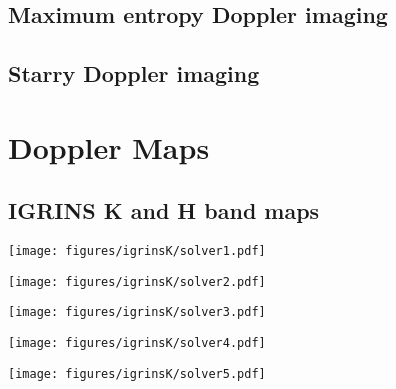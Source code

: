 \documentclass[twocolumn]{aastex631}
\begin{document}
\subsection{Maximum entropy Doppler imaging}

\subsection{Starry Doppler imaging}


\section{Doppler Maps}

\subsection{IGRINS K and H band maps}

\iftrue
\begin{figure*}
    \centering
    \begin{minipage}[b]{0.18\textwidth}
        \centering
        \texttt{[image: figures/igrinsK/solver1.pdf]}
        \label{fig:igrinsKsolver1}
     \end{minipage}
     \hfill
     \begin{minipage}[b]{0.18\textwidth}
         \centering
         \texttt{[image: figures/igrinsK/solver2.pdf]}
         \label{fig:igrinsKsolver2}
     \end{minipage}
     \hfill
     \begin{minipage}[b]{0.18\textwidth}
         \centering
         \texttt{[image: figures/igrinsK/solver3.pdf]}
         \label{fig:igrinsKsolver3}
     \end{minipage}
     \hfill
     \begin{minipage}[b]{0.18\textwidth}
         \centering
         \texttt{[image: figures/igrinsK/solver4.pdf]}
         \label{fig:igrinsKsolver4}
     \end{minipage}
     \hfill
     \begin{minipage}[b]{0.18\textwidth}
         \centering
         \texttt{[image: figures/igrinsK/solver5.pdf]}
         \label{fig:igrinsKsolver5}
     \end{minipage}
\end{figure*}
\fi
\end{document}

